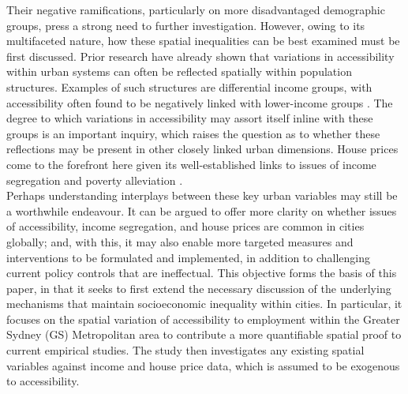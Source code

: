 Their negative ramifications, particularly on more disadvantaged demographic groups, press a strong need to further investigation. However, owing to its multifaceted nature, how these spatial inequalities can be best examined must be first discussed. Prior research have already shown that variations in accessibility within urban systems can often be reflected spatially within population structures. Examples of such structures are differential income groups, with accessibility often found to be negatively linked with lower-income groups \citep{weber2002bringing,ohnishi2011evolution,de2013explaining}. The degree to which variations in accessibility may assort itself inline with these groups is an important inquiry, which raises the question as to whether these reflections may be present in other closely linked urban dimensions. House prices come to the forefront here given its well-established links to issues of income segregation and poverty alleviation \citep{maattanen2014income}.\\ 

Perhaps understanding interplays between these key urban variables may still be a worthwhile endeavour. It can be argued to offer more clarity on whether issues of accessibility, income segregation, and house prices are common in cities globally; and, with this, it may also enable more targeted measures and interventions to be formulated and implemented, in addition to challenging current policy controls that are ineffectual. This objective forms the basis of this paper, in that it seeks to first extend the necessary discussion of the underlying mechanisms that maintain socioeconomic inequality within cities. In particular, it focuses on the spatial variation of accessibility to employment within the Greater Sydney (GS) Metropolitan area to contribute a more quantifiable spatial proof to current empirical studies. The study then investigates any existing spatial variables against income and house price data, which is assumed to be exogenous to accessibility.\\

